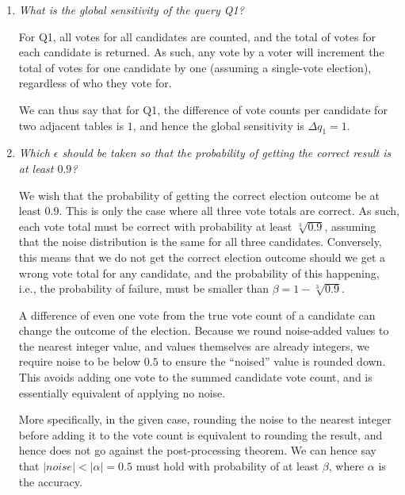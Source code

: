 \documentclass[parskip=half]{scrartcl}
\begin{document}
\begin{enumerate}
    \item \textit{What is the global sensitivity of the query Q1?}
    
    For Q1, all votes for all candidates are counted, and the total of votes
    for each candidate is returned. As such, any vote by a voter will increment
    the total of votes for one candidate by one (assuming a single-vote
    election), regardless of who they vote for.

    We can thus say that for Q1, the difference of vote counts per candidate
    for two adjacent tables is $1$, and hence the global sensitivity is
    $\Delta q_1 = 1$.
    
    \item \textit{Which $\epsilon$ should be taken so that the probability of
    getting the correct result is at least $0.9$?}

    We wish that the probability of getting the correct election outcome be at
    least $0.9$. This is only the case where all three vote totals are correct.
    As such, each vote total must be correct with probability at least
    $\sqrt[3]{0.9}$, assuming that the noise distribution is the same for all
    three candidates. Conversely, this means that we do not get the correct
    election outcome should we get a wrong vote total for any candidate, and
    the probability of this happening, i.e., the probability of failure, must
    be smaller than $\beta = 1-\sqrt[3]{0.9}$.

    A difference of even one vote from the true vote count of a candidate can
    change the outcome of the election. Because we round noise-added values to
    the nearest integer value, and values themselves are already integers, we
    require noise to be below $0.5$ to ensure the ``noised'' value is
    rounded down. This avoids adding one vote to the summed candidate vote
    count, and is essentially equivalent of applying no noise.
    
    More specifically, in the given case, rounding the noise to the nearest
    integer before adding it to the vote count is equivalent to rounding the
    result, and hence does not go against the post-processing theorem. We can
    hence say that $|\textit{noise}| < |\alpha| = 0.5$ must hold with
    probability of at least $\beta$\footnotemark{}, where $\alpha$ is the
    accuracy.



\end{enumerate}
\end{document}
